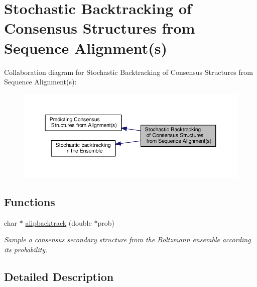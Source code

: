 \hypertarget{group__consensus__stochbt}{\section{Stochastic Backtracking of Consensus Structures from Sequence Alignment(s)}
\label{group__consensus__stochbt}
}
Collaboration diagram for Stochastic Backtracking of Consensus Structures from Sequence Alignment(s)\-:
\nopagebreak
\begin{figure}[H]
\begin{center}
\leavevmode
\includegraphics[width=350pt]{group__consensus__stochbt}
\end{center}
\end{figure}
\subsection*{Functions}
\begin{DoxyCompactItemize}
\item 
char $\ast$ \hyperlink{group__consensus__stochbt_ga0df40248788f0fb17ebdc59d74116d1c}{alipbacktrack} (double $\ast$prob)
\begin{DoxyCompactList}\small\item\em Sample a consensus secondary structure from the Boltzmann ensemble according its probability. \end{DoxyCompactList}\end{DoxyCompactItemize}


\subsection{Detailed Description}


